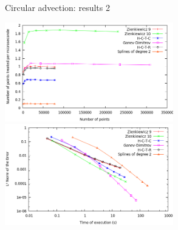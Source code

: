\documentclass[]{beamer}
\begin{document}
%	
%


\begin{frame}{Circular advection: results 2}

    \hspace*{2.cm}
\includegraphics[width=0.55\textwidth]{efficiency.png}\\
    \hspace*{2.cm}
\includegraphics[width=0.55\textwidth]{time_norm.png}

\end{frame}
\end{document}
